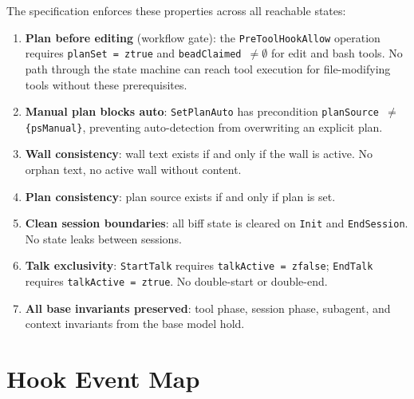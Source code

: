 \documentclass[a4paper,10pt,fleqn]{article}
\begin{document}
The specification enforces these properties across all reachable states:

\begin{enumerate}
  \item \textbf{Plan before editing} (workflow gate): the
    \texttt{PreToolHookAllow} operation requires \texttt{planSet = ztrue}
    and \texttt{beadClaimed $\neq \emptyset$} for edit and bash tools.
    No path through the state machine can reach tool execution for
    file-modifying tools without these prerequisites.

  \item \textbf{Manual plan blocks auto}: \texttt{SetPlanAuto} has
    precondition \texttt{planSource $\neq$ \{psManual\}}, preventing
    auto-detection from overwriting an explicit plan.

  \item \textbf{Wall consistency}: wall text exists if and only if
    the wall is active. No orphan text, no active wall without content.

  \item \textbf{Plan consistency}: plan source exists if and only if
    plan is set.

  \item \textbf{Clean session boundaries}: all biff state is cleared
    on \texttt{Init} and \texttt{EndSession}. No state leaks between
    sessions.

  \item \textbf{Talk exclusivity}: \texttt{StartTalk} requires
    \texttt{talkActive = zfalse}; \texttt{EndTalk} requires
    \texttt{talkActive = ztrue}. No double-start or double-end.

  \item \textbf{All base invariants preserved}: tool phase, session
    phase, subagent, and context invariants from the base model hold.
\end{enumerate}

\section{Hook Event Map}
\end{document}
